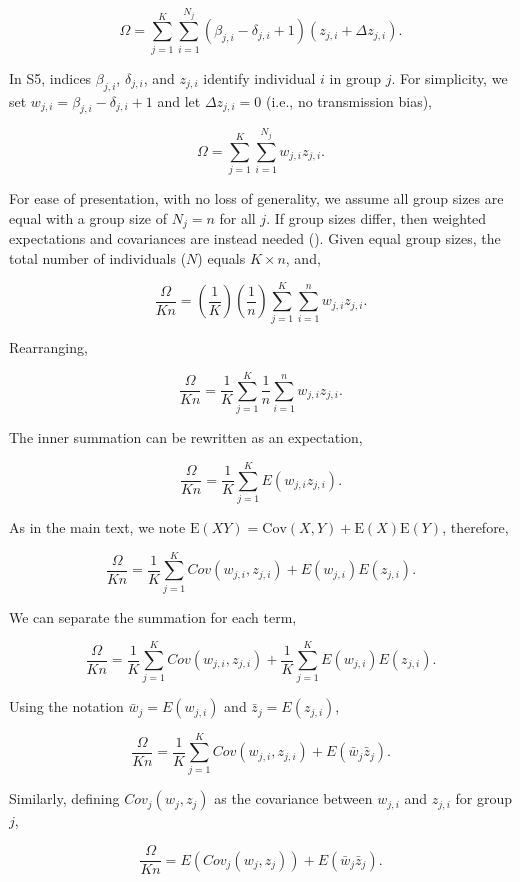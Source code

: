 \documentclass[
]{article}
\begin{document}
\[\Omega = \sum_{j=1}^{K}\sum_{i=1}^{N_{j}}\left(\beta_{j,i} - \delta_{j,i} + 1 \right)\left(z_{j, i} + \Delta z_{j, i}\right).
\tag{S5}
\]

In S5, indices \(\beta_{j, i}\), \(\delta_{j, i}\), and \(z_{j, i}\)
identify individual \(i\) in group \(j\). For simplicity, we set
\(w_{j, i} = \beta_{j, i} - \delta_{j, i} + 1\) and let
\(\Delta z_{j, i} = 0\) (i.e., no transmission bias),

\[\Omega = \sum_{j=1}^{K}\sum_{i=1}^{N_{j}}w_{j,i}z_{j, i}.\]

For ease of presentation, with no loss of generality, we assume all
group sizes are equal with a group size of \(N_{j} = n\) for all \(j\).
If group sizes differ, then weighted expectations and covariances are
instead needed (). Given
equal group sizes, the total number of individuals (\(N\)) equals
\(K \times n\), and,

\[\frac{\Omega}{K n} = \left(\frac{1}{K}\right)\left(\frac{1}{n}\right)\sum_{j=1}^{K}\sum_{i=1}^{n}w_{j,i}z_{j, i}.\]

Rearranging,

\[\frac{\Omega}{K n} = \frac{1}{K}\sum_{j=1}^{K}\frac{1}{n}\sum_{i=1}^{n}w_{j,i}z_{j, i}.\]

The inner summation can be rewritten as an expectation,

\[\frac{\Omega}{K n} = \frac{1}{K}\sum_{j=1}^{K}E\left(w_{j,i} z_{j,i}\right).\]

As in the main text, we note
\(\mathrm{E}(XY) = \mathrm{Cov}(X,Y) + \mathrm{E}(X)\mathrm{E}(Y)\),
therefore,

\[\frac{\Omega}{K n} = \frac{1}{K}\sum_{j=1}^{K}Cov\left(w_{j,i}, z_{j,i}\right) + E\left(w_{j,i}\right)E\left(z_{j,i}\right).\]

We can separate the summation for each term,

\[\frac{\Omega}{K n} = \frac{1}{K}\sum_{j=1}^{K}Cov\left(w_{j,i}, z_{j,i}\right) + \frac{1}{K}\sum_{j=1}^{K}E\left(w_{j,i}\right)E\left(z_{j,i}\right).\]

Using the notation \(\bar{w}_{j} = E(w_{j,i})\) and
\(\bar{z}_{j} = E(z_{j,i})\),

\[\frac{\Omega}{K n} = \frac{1}{K}\sum_{j=1}^{K}Cov\left(w_{j,i}, z_{j,i}\right) + E\left(\bar{w}_{j} \bar{z}_{j} \right).\]

Similarly, defining \(Cov_{j}(w_{j}, z_{j})\) as the covariance between
\(w_{j,i}\) and \(z_{j, i}\) for group \(j\),

\[\frac{\Omega}{K n} = E\left(Cov_{j}\left(w_{j}, z_{j}\right)\right) + E\left(\bar{w}_{j} \bar{z}_{j} \right).\]
\end{document}
